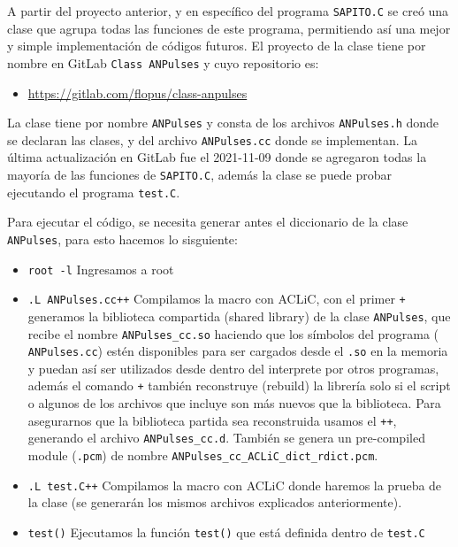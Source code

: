 \documentclass[11pt,letterpaper]{article}
\begin{document}
A partir del proyecto anterior, y en específico del programa \verb|SAPITO.C| se creó una clase que agrupa todas las funciones de este programa, permitiendo así una mejor y simple implementación de códigos futuros. El proyecto de la clase tiene por nombre en GitLab \verb|Class ANPulses| y cuyo repositorio es:

\begin{itemize}
\item \url{https://gitlab.com/flopus/class-anpulses}
\end{itemize}

La clase tiene por nombre \verb|ANPulses| y consta de los archivos \verb|ANPulses.h| donde se declaran las clases, y del archivo \verb|ANPulses.cc| donde se implementan. La última actualización en GitLab fue el 2021-11-09 donde se agregaron todas la mayoría de las funciones de \verb|SAPITO.C|, además la clase se puede probar ejecutando el programa \verb|test.C|.

\begin{tip}
Para ejecutar el código, se necesita generar antes el diccionario de la clase \verb|ANPulses|, para esto hacemos lo sisguiente:

\begin{itemize}
\item \verb|root -l| \quad Ingresamos a root
\item \verb|.L ANPulses.cc++| \quad Compilamos la macro con ACLiC, con el primer \verb|+| generamos la biblioteca compartida (shared library) de la clase \verb|ANPulses|, que recibe el nombre \verb|ANPulses_cc.so| haciendo que los símbolos del programa ( \verb|ANPulses.cc|) estén disponibles para ser cargados desde el \verb|.so| en la memoria y puedan así ser utilizados desde dentro del interprete por otros programas, además el comando \verb|+| también reconstruye (rebuild) la librería solo si el script o algunos de los archivos que incluye son más nuevos que la biblioteca. Para asegurarnos que la biblioteca partida sea reconstruida usamos el \verb|++|, generando el archivo \verb|ANPulses_cc.d|. También se genera un pre-compiled module (\verb|.pcm|) de nombre \verb|ANPulses_cc_ACLiC_dict_rdict.pcm|.
\item \verb|.L test.C++| \quad Compilamos la macro con ACLiC donde haremos la prueba de la clase (se generarán los mismos archivos explicados anteriormente).
\item \verb|test()| \quad Ejecutamos la función \verb|test()| que está definida dentro de \verb|test.C|
\end{itemize}
\end{tip} 
\end{document}
